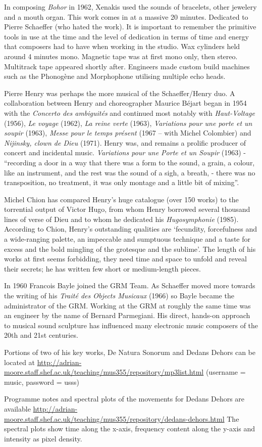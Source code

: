 In composing \textit{Bohor} in 1962, Xenakis used the sounds of bracelets, other jewelery and a mouth organ. This work comes in at a massive 20 minutes. Dedicated to Pierre Schaeffer (who hated the work). It is important to remember the primitive tools in use at the time and the level of dedication in terms of time and energy that composers had to have when working in the studio. Wax cylinders held around 4 minutes mono. Magnetic tape was at first mono only, then stereo. Multitrack tape appeared shortly after. Engineers made custom build machines such as the Phonog\`ene and Morphophone utilising multiple echo heads.

Pierre Henry was perhaps the more musical of the Schaeffer/Henry duo. A collaboration between Henry and choreographer Maurice Béjart began in 1954 with the \textit{Concerto des ambiguit\'es} and continued most notably with \textit{Haut-Voltage} (1956), \textit{Le voyage} (1962), \textit{La reine verte} (1963), \textit{Variations pour une porte et un soupir} (1963), \textit{Messe pour le temps
pr\'esent} (1967 – with Michel Colombier) and \textit{Nijinsky, clown de Dieu} (1971). Henry was, and remains a prolific producer of concert and incidental music. \textit{Variations pour une Porte et un Soupir} (1963) - ``recording a door in a way that there was
a form to the sound, a grain, a colour, like an instrument, and the rest was the sound of a sigh, a breath, - there was no transposition, no treatment, it was only montage and a little bit of mixing''.

Michel Chion has compared Henry's huge catalogue (over 150 works) to the torrential output of Victor Hugo, from whom Henry borrowed several thousand lines of verse of Dieu and to whom he dedicated his \textit{Hugosymphonie} (1985). According to Chion, Henry's
outstanding qualities are `fecundity, forcefulness and a wide-ranging palette, an impeccable and sumptuous technique and a taste for excess and the bold mingling of the grotesque and the sublime'. The length of his works at first seems forbidding, they need
time and space to unfold and reveal their secrets; he has written few short or medium-length pieces.

In 1960 Francois Bayle joined the GRM Team. As Schaeffer moved more towards the writing of his \textit{Trait\'e des Objects Musicaux} (1966) so Bayle became the administrator of the GRM. Working at the GRM at roughly the same time was an engineer by the name of Bernard
Parmegiani. His direct, hands-on approach to musical sound sculpture has influenced many electronic music composers of the 20th and 21st centuries.

Portions of two of his key works, De Natura Sonorum and Dedans Dehors can be located at \url{http://adrian-moore.staff.shef.ac.uk/teaching/mus355/repository/mp3list.html} (username = music, password = usss)

Programme notes and spectral plots of the movements for Dedans Dehors are available \url{http://adrian-moore.staff.shef.ac.uk/teaching/mus355/repository/dedans-dehors.html} The spectral plots show time along the x-axis, frequency content along the y-axis and
intensity as pixel density.



